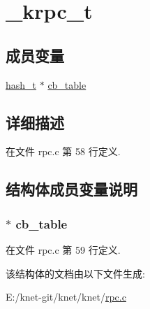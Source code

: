\hypertarget{struct__krpc__t}{}\section{\+\_\+krpc\+\_\+t}
\label{struct__krpc__t}
\subsection*{成员变量}
\begin{DoxyCompactItemize}
\item 
\hyperlink{config_8h_a188677c3015513590ab998e96b999966}{hash\+\_\+t} $\ast$ \hyperlink{struct__krpc__t_a65bda089e2b3ac637e68a579fd0c9f5e}{cb\+\_\+table}
\end{DoxyCompactItemize}


\subsection{详细描述}


在文件 rpc.\+c 第 58 行定义.



\subsection{结构体成员变量说明}
\hypertarget{struct__krpc__t_a65bda089e2b3ac637e68a579fd0c9f5e}{}
\subsubsection[{cb\+\_\+table}]{$\ast$ cb\+\_\+table}\label{struct__krpc__t_a65bda089e2b3ac637e68a579fd0c9f5e}


在文件 rpc.\+c 第 59 行定义.



该结构体的文档由以下文件生成\+:\begin{DoxyCompactItemize}
\item 
E\+:/knet-\/git/knet/knet/\hyperlink{knet_2rpc_8c}{rpc.\+c}\end{DoxyCompactItemize}
